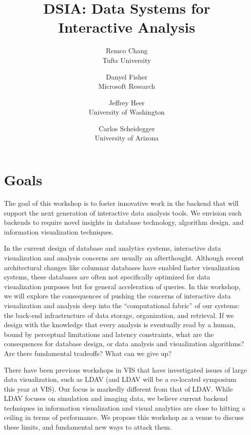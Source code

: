 \documentclass[journal]{vgtc}                %
\title{DSIA: Data Systems for Interactive Analysis}
\author{Remco Chang\\
	\scriptsize Tufts University 
	\and Danyel Fisher\\
	\scriptsize Microsoft Research 
	\and Jeffrey Heer\\
	\scriptsize University of Washington
 	\and Carlos Scheidegger\\
 	\scriptsize University of Arizona}
\begin{document}
\maketitle
\section{Goals}
The goal of this workshop is to foster innovative work in the backend that will support the next generation of interactive data analysis tools. 
We envision such backends to require novel insights in database technology, algorithm design, and information visualization techniques.

In the current design of database and analytics systems, interactive data visualization and analysis concerns are usually an afterthought. 
Although recent architectural changes like columnar databases have enabled faster visualization systems, these databases are often not specifically optimized for data visualization purposes but for general acceleration of queries. 
In this workshop, we will explore the consequences of pushing the concerns of interactive data visualization and analysis deep into the ``computational fabric'' of our systems: the back-end infrastructure of data storage, organization, and retrieval. 
If we design with the knowledge that every analysis is eventually read by a human, bound by perceptual limitations and latency constraints, what are the consequences for database design, or data analysis and visualization algorithms? 
Are there fundamental tradeoffs? 
What can we give up?

There have been previous workshops in VIS that have investigated issues of large data visualization, such as LDAV (and LDAV will be a co-located symposium this year at VIS). 
Our focus is markedly different from that of LDAV. 
While LDAV focuses on simulation and imaging data, we believe current backend techniques in information visualization and visual analytics are close to hitting a ceiling in terms of performance. 
We propose this workshop as a venue to discuss these limits, and fundamental new ways to attack them.
\end{document}
